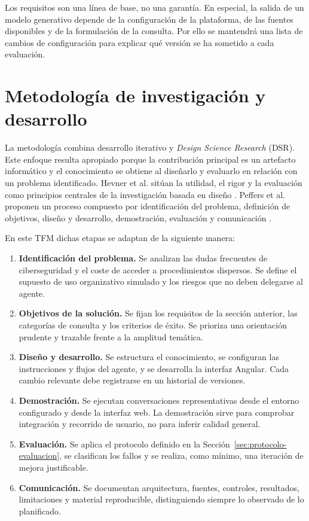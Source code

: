 Los requisitos son una línea de base, no una garantía. En especial, la salida de
un modelo generativo depende de la configuración de la plataforma, de las fuentes
disponibles y de la formulación de la consulta. Por ello se mantendrá una lista
de cambios de configuración para explicar qué versión se ha sometido a cada
evaluación.

\section{Metodología de investigación y desarrollo}
\label{sec:metodologia}

La metodología combina desarrollo iterativo y \emph{Design Science Research}
(DSR). Este enfoque resulta apropiado porque la contribución principal es un
artefacto informático y el conocimiento se obtiene al diseñarlo y evaluarlo en
relación con un problema identificado. Hevner et al. sitúan la utilidad, el
rigor y la evaluación como principios centrales de la investigación basada en
diseño \cite{hevner2004}. Peffers et al. proponen un proceso compuesto por
identificación del problema, definición de objetivos, diseño y desarrollo,
demostración, evaluación y comunicación \cite{peffers2007}.

En este TFM dichas etapas se adaptan de la siguiente manera:

\begin{enumerate}
  \item \textbf{Identificación del problema.} Se analizan las dudas frecuentes
  de ciberseguridad y el coste de acceder a procedimientos dispersos. Se define
  el supuesto de uso organizativo simulado y los riesgos que no deben delegarse
  al agente.
  \item \textbf{Objetivos de la solución.} Se fijan los requisitos de la
  sección anterior, las categorías de consulta y los criterios de éxito. Se
  prioriza una orientación prudente y trazable frente a la amplitud temática.
  \item \textbf{Diseño y desarrollo.} Se estructura el conocimiento, se
  configuran las instrucciones y flujos del agente, y se desarrolla la interfaz
  Angular. Cada cambio relevante debe registrarse en un historial de versiones.
  \item \textbf{Demostración.} Se ejecutan conversaciones representativas desde
  el entorno configurado y desde la interfaz web. La demostración sirve para
  comprobar integración y recorrido de usuario, no para inferir calidad general.
  \item \textbf{Evaluación.} Se aplica el protocolo definido en la
  Sección~\ref{sec:protocolo-evaluacion}, se clasifican los fallos y se realiza,
  como mínimo, una iteración de mejora justificable.
  \item \textbf{Comunicación.} Se documentan arquitectura, fuentes, controles,
  resultados, limitaciones y material reproducible, distinguiendo siempre lo
  observado de lo planificado.
\end{enumerate}

